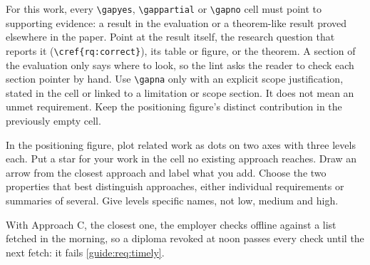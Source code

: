 For this work, every \texttt{\textbackslash gapyes}, \texttt{\textbackslash gappartial} or \texttt{\textbackslash gapno} cell must point to supporting evidence: a result in the evaluation or a theorem-like result proved elsewhere in the paper. Point at the result itself, the research question that reports it (\texttt{\textbackslash cref\{rq:correct\}}), its table or figure, or the theorem. A section of the evaluation only says where to look, so the lint asks the reader to check each section pointer by hand. Use \texttt{\textbackslash gapna} only with an explicit scope justification, stated in the cell or linked to a limitation or scope section. It does not mean an unmet requirement. Keep the positioning figure's distinct contribution in the previously empty cell.

In the positioning figure, plot related work as dots on two axes with three levels each. Put a star for your work in the cell no existing approach reaches. Draw an arrow from the closest approach and label what you add. Choose the two properties that best distinguish approaches, either individual requirements or summaries of several. Give levels specific names, not low, medium and high.
\begin{runningexample}[elsewhere]
With Approach C, the closest one, the employer checks offline against a list fetched in the morning, so a diploma revoked at noon passes every check until the next fetch: it fails \cref{guide:req:timely}.
\end{runningexample}

